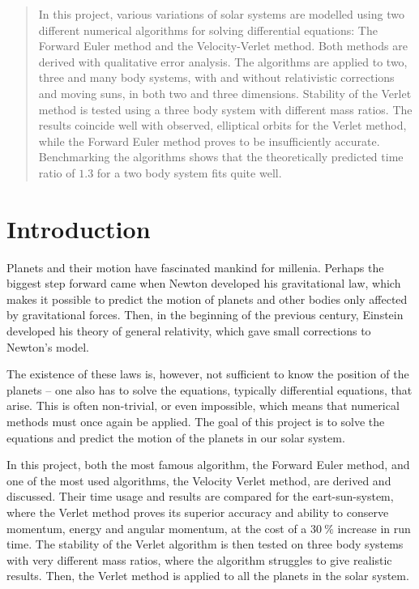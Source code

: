 \documentclass[12pt,english,a4paper]{article}
\begin{document}

\pagestyle{fancy}
\tableofcontents

%

\begin{abstract}
In this project, various variations of solar systems are modelled using two different numerical algorithms for solving differential equations: The Forward Euler method and the Velocity-Verlet method. Both methods are derived with qualitative error analysis. The algorithms are applied to two, three and many body systems, with and without relativistic corrections and moving suns, in both two and three dimensions. Stability of the Verlet method is tested using a three body system with different mass ratios. The results coincide well with observed, elliptical orbits for the Verlet method, while the Forward Euler method proves to be insufficiently accurate. Benchmarking the algorithms shows that the theoretically predicted time ratio of \(\num{1.3}\) for a two body system fits quite well.
\end{abstract}



\clearpage
\section{Introduction}
Planets and their motion have fascinated mankind for millenia. Perhaps the biggest step forward came when Newton developed his gravitational law, which makes it possible to predict the motion of planets and other bodies only affected by gravitational forces. Then, in the beginning of the previous century, Einstein developed his theory of general relativity, which gave small corrections to Newton's model.

The existence of these laws is, however, not sufficient to know the position of the planets -- one also has to solve the equations, typically differential equations, that arise. This is often non-trivial, or even impossible, which means that numerical methods must once again be applied. The goal of this project is to solve the equations and predict the motion of the planets in our solar system.

In this project, both the most famous algorithm, the Forward Euler method, and one of the most used algorithms, the Velocity Verlet method, are derived and discussed. Their time usage and results are compared for the eart-sun-system, where the Verlet method proves its superior accuracy and ability to conserve momentum, energy and angular momentum, at the cost of a \(\SI{30}{\percent}\) increase in run time. The stability of the Verlet algorithm is then tested on three body systems with very different mass ratios, where the algorithm struggles to give realistic results. Then, the Verlet method is applied to all the planets in the solar system.
\end{document}
